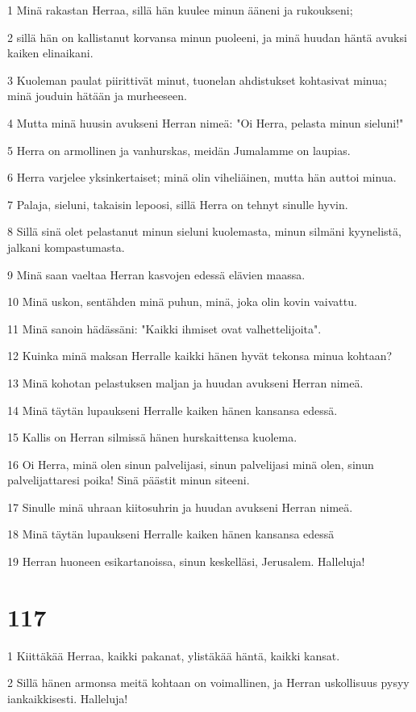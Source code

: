\par 1 Minä rakastan Herraa, sillä hän kuulee minun ääneni ja rukoukseni;
\par 2 sillä hän on kallistanut korvansa minun puoleeni, ja minä huudan häntä avuksi kaiken elinaikani.
\par 3 Kuoleman paulat piirittivät minut, tuonelan ahdistukset kohtasivat minua; minä jouduin hätään ja murheeseen.
\par 4 Mutta minä huusin avukseni Herran nimeä: "Oi Herra, pelasta minun sieluni!"
\par 5 Herra on armollinen ja vanhurskas, meidän Jumalamme on laupias.
\par 6 Herra varjelee yksinkertaiset; minä olin viheliäinen, mutta hän auttoi minua.
\par 7 Palaja, sieluni, takaisin lepoosi, sillä Herra on tehnyt sinulle hyvin.
\par 8 Sillä sinä olet pelastanut minun sieluni kuolemasta, minun silmäni kyynelistä, jalkani kompastumasta.
\par 9 Minä saan vaeltaa Herran kasvojen edessä elävien maassa.
\par 10 Minä uskon, sentähden minä puhun, minä, joka olin kovin vaivattu.
\par 11 Minä sanoin hädässäni: "Kaikki ihmiset ovat valhettelijoita".
\par 12 Kuinka minä maksan Herralle kaikki hänen hyvät tekonsa minua kohtaan?
\par 13 Minä kohotan pelastuksen maljan ja huudan avukseni Herran nimeä.
\par 14 Minä täytän lupaukseni Herralle kaiken hänen kansansa edessä.
\par 15 Kallis on Herran silmissä hänen hurskaittensa kuolema.
\par 16 Oi Herra, minä olen sinun palvelijasi, sinun palvelijasi minä olen, sinun palvelijattaresi poika! Sinä päästit minun siteeni.
\par 17 Sinulle minä uhraan kiitosuhrin ja huudan avukseni Herran nimeä.
\par 18 Minä täytän lupaukseni Herralle kaiken hänen kansansa edessä
\par 19 Herran huoneen esikartanoissa, sinun keskelläsi, Jerusalem. Halleluja!

\chapter{117}

\par 1 Kiittäkää Herraa, kaikki pakanat, ylistäkää häntä, kaikki kansat.
\par 2 Sillä hänen armonsa meitä kohtaan on voimallinen, ja Herran uskollisuus pysyy iankaikkisesti. Halleluja!

